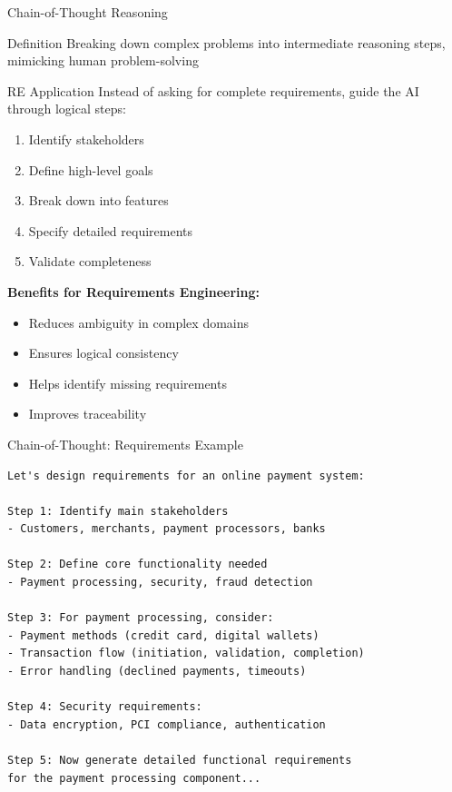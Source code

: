 \documentclass{beamer}
\begin{document}
\begin{frame}{Chain-of-Thought Reasoning}
    \begin{block}{Definition}
        Breaking down complex problems into intermediate reasoning steps, mimicking human problem-solving
    \end{block}
    
    \begin{exampleblock}{RE Application}
        Instead of asking for complete requirements, guide the AI through logical steps:
        \begin{enumerate}
            \item Identify stakeholders
            \item Define high-level goals
            \item Break down into features
            \item Specify detailed requirements
            \item Validate completeness
        \end{enumerate}
    \end{exampleblock}
    
    \textbf{Benefits for Requirements Engineering:}
    \begin{itemize}
        \item Reduces ambiguity in complex domains
        \item Ensures logical consistency
        \item Helps identify missing requirements
        \item Improves traceability
    \end{itemize}
\end{frame}

\begin{frame}[fragile]{Chain-of-Thought: Requirements Example}
    \begin{lstlisting}[style=code, caption={Chain-of-Thought for Payment System}]
Let's design requirements for an online payment system:

Step 1: Identify main stakeholders
- Customers, merchants, payment processors, banks

Step 2: Define core functionality needed
- Payment processing, security, fraud detection

Step 3: For payment processing, consider:
- Payment methods (credit card, digital wallets)
- Transaction flow (initiation, validation, completion)
- Error handling (declined payments, timeouts)

Step 4: Security requirements:
- Data encryption, PCI compliance, authentication

Step 5: Now generate detailed functional requirements 
for the payment processing component...
    \end{lstlisting}
\end{frame}
\end{document}
